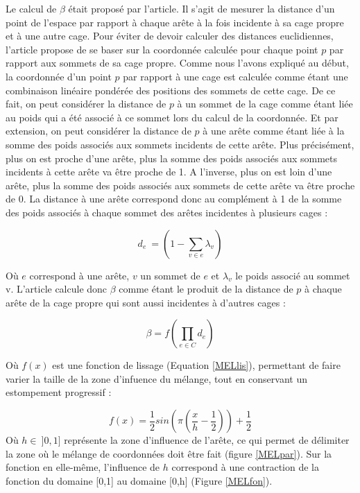 Le calcul de $\beta$ était proposé par l'article. Il s'agit de mesurer
la distance d'un point de l'espace par rapport à chaque arête à la
fois incidente à sa cage propre et à une autre cage. Pour éviter de
devoir calculer des distances euclidiennes, l'article propose de se
baser sur la coordonnée calculée pour chaque point $p$ par rapport aux
sommets de sa cage propre. Comme nous l'avons expliqué au début, la
coordonnée d'un point $p$ par rapport à une cage est calculée comme
étant une combinaison linéaire pondérée des positions des sommets de
cette cage. De ce fait, on peut considérer la distance de $p$ à un
sommet de la cage comme étant liée au poids qui a été associé à ce
sommet lors du calcul de la coordonnée. Et par extension, on peut
considérer la distance de $p$ à une arête comme étant liée à la somme
des poids associés aux sommets incidents de cette arête. Plus
précisément, plus on est proche d'une arête, plus la somme des poids
associés aux sommets incidents à cette arête va être proche de 1. A
l'inverse, plus on est loin d'une arête, plus la somme des poids
associés aux sommets de cette arête va être proche de 0. La distance à
une arête correspond donc au complément à 1 de la somme des poids
associés à chaque sommet des arêtes incidentes à plusieurs cages :

\begin{equation}
  d_e~ = (1 - \sum_{v \in e} \lambda_v)
\end{equation}

Où $e$ correspond à une arête, $v$ un sommet de $e$ et $\lambda_v$ le
poids associé au sommet v. L'article calcule donc $\beta$ comme étant
le produit de la distance de $p$ à chaque arête de la cage propre qui
sont aussi incidentes à d'autres cages :

\begin{equation}
  \beta = f(\prod_{e \in C} d_e)
\end{equation}

Où $f(x)$ est une fonction de lissage (Equation \ref{MELlis}),
permettant de faire varier la taille de la zone d'infuence du mélange,
tout en conservant un estompement progressif :

\begin{equation}
  f(x) = \frac{1}{2} sin(\pi(\frac{x}{h}-\frac{1}{2})) + \frac{1}{2}
  \label{MELlis}
\end{equation}
Où $h \in~ ]0,1]$ représente la zone d'influence de l'arête, ce qui
permet de délimiter la zone où le mélange de coordonnées doit être
fait (figure \ref{MELpar}). Sur la fonction en elle-même, l'influence
de $h$ correspond à une contraction de la fonction du domaine [0,1] au
domaine [0,h] (Figure \ref{MELfon}).

